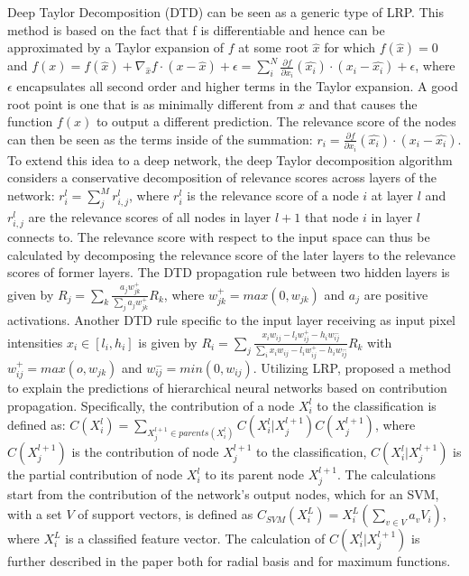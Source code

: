 \documentclass[journal]{IEEEtran}
\begin{document}
Deep Taylor Decomposition (DTD) \cite{Montavon2017} \cite{Kauffmann2020} \cite{Montavon2016} can be seen as a generic type of LRP. This method is based on the fact that f is differentiable and hence can be approximated by a Taylor expansion of $f$ at some root $\hat{x}$ for which $f(\hat{x})=0$ and $f(x)=f(\hat{x})+\nabla_{\hat{x}} f \cdot (x-\hat{x})+\epsilon=\sum_i^N\frac{\partial f}{\partial x_i}(\hat{x_i}) \cdot (x_i - \hat{x_i})+\epsilon$, where $\epsilon$ encapsulates all second order and higher terms in the Taylor expansion. A good root point is one that is as minimally different from $x$ and that causes the function $f(x)$ to output a different prediction. The relevance score of the nodes can then be seen as the terms inside of the summation: $r_i=\frac{\partial f}{\partial x_i}(\hat{x_i}) \cdot (x_i-\hat{x_i})$. To extend this idea to a deep network, the deep Taylor decomposition algorithm considers a conservative decomposition of relevance scores across layers of the network: $r_i^l=\sum_j^Mr_{i,j}^l$, where $r_i^l$ is the relevance score of a node $i$ at layer $l$ and $r_{i,j}^l$ are the relevance scores of all nodes in layer $l+1$ that node $i$ in layer $l$ connects to. The relevance score with respect to the input space can thus be calculated by decomposing the relevance score of the later layers to the relevance scores of former layers. The DTD propagation rule between two hidden layers is given by $R_j=\sum_k \frac{a_j w_{jk}^+}{\sum_j a_j w_{jk}^+}R_k$, where $w_{jk}^+=max(0,w_{jk})$ and $a_j$ are positive activations. Another DTD rule specific to the input layer receiving as input pixel intensities $x_i \in [l_i,h_i]$ is given by $R_i=\sum_j \frac{x_iw_{ij}-l_iw_{ij}^+-h_iw_{ij}^-}{\sum_i x_iw_{ij}-l_iw_{ij}^+-h_iw_{ij}^-} R_k$ with $w_{ij}^+=max(o,w_{jk})$ and $w_{ij}^-=min(0,w_{ij})$.
Utilizing LRP, \cite{Landecker2013} proposed a method to explain the predictions of hierarchical neural networks based on contribution propagation. Specifically, the contribution of a node $X_i^l$ to the classification is defined as: $C(X_i^l) = \sum_{X_j^{l+1} \in parents(X_i^l)} C(X_i^l | X_j^{l+1})C(X_j^{l+1})$, where $C(X_j^{l+1})$ is the contribution of node $X_j^{l+1}$  to the classification,  $C(X_i^l | X_j^{l+1})$ is the partial contribution of node $X_i^l$ to its parent node $X_j^{l+1}$. The calculations start from  the contribution of the network's output nodes, which for an SVM, with a set $V$ of support vectors, is defined as $C_{SVM}(X_i^L)=X_i^L(\sum_{v \in V}a_vV_i)$, where $X_i^L$ is a classified feature vector. The calculation of $C(X_i^l|X_j^{l+1})$ is further described in the paper both for radial basis and for maximum functions. 
\end{document}
